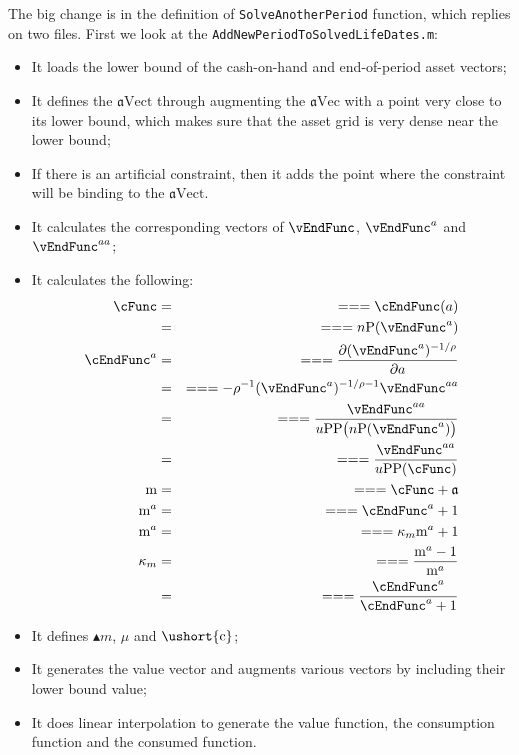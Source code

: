 \documentclass[titlepage,abstract]{\econtex}
\providecommand{\mFunc}{\ensuremath{\mathrm{m}}}
\providecommand{\aEndFunc}{\ensuremath{\mathfrak{a}}}
\begin{document}
The big change is in the definition of \texttt{SolveAnotherPeriod} function, which replies on two files. First we look at the \texttt{AddNewPeriodToSolvedLifeDates.m}:
      \begin{itemize}
        \item It loads the lower bound of the cash-on-hand and end-of-period asset vectors;
        \item It defines the $\ensuremath{\mathfrak{a}}\text{Vect}$ through augmenting the $\ensuremath{\mathfrak{a}}\text{Vec}$ with a point very close to its lower bound, which makes sure that the asset grid is very dense near the lower bound;
        \item If there is an artificial constraint, then it adds the point where the constraint will be binding to the $\ensuremath{\mathfrak{a}}\text{Vect}$.
        \item It calculates the corresponding vectors of $\vEndFunc$, $\vEndFunc^{a}$ and $\vEndFunc^{aa}$;
        \item It calculates the following:
        \begin{equation}\begin{gathered}\begin{aligned}
        \cFunc    &=& =  =  =  \cEndFunc(a) \\
           &=& =  =  =  n\text{P}(\vEndFunc^{a}) \\
        \cEndFunc^{a}    &=& =  =  = \frac{\partial (\vEndFunc^{a})^{-1/\rho}}{\partial a} \\
           &=& =  =  =  -\rho^{-1} (\vEndFunc^{a})^{-1/\rho-1} \vEndFunc^{aa} \\
           &=& =  =  =  \frac{\vEndFunc^{aa} }{u\text{PP}\big(
        n\text{P}(\vEndFunc^{a})\big)} \\
           &=& =  =  =  \frac{\vEndFunc^{aa} }{u\text{PP}(\cFunc)} \\
        \mFunc    &=& =  =  =  \cFunc + \aEndFunc \\
        \mFunc^{a}    &=& =  =  =  \cEndFunc^{a} + 1 \\
        \mFunc^{a}    &=& =  =  =  \kappa_{m}\mFunc^{a} + 1 \\
        \kappa_{m}    &=& =  =  =  \frac{\mFunc^{a}-1}{\mFunc^{a}} \\
           &=& =  =  =  \frac{\cEndFunc^{a}}{\cEndFunc^{a}+1}
        \end{aligned}\end{gathered}\end{equation}
        \item It defines $\ensuremath{\blacktriangle {m}}$, $\mu$ and $\ensuremath{\ushort{\mathrm{c}}}$;
        \item It generates the value vector and augments various vectors by including their lower bound value;
        \item It does linear interpolation to generate the value function, the consumption function and the consumed function.
        \end{itemize}
\end{document}
